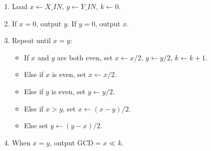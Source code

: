 \documentclass[11pt,a4paper]{article}
\begin{document}
\begin{enumerate}
  \item Load $x \leftarrow X\_IN$, $y \leftarrow Y\_IN$, $k \leftarrow 0$.
  \item If $x=0$, output $y$. If $y=0$, output $x$.
  \item Repeat until $x=y$:
  \begin{itemize}
    \item If $x$ and $y$ are both even, set $x \leftarrow x/2$, $y \leftarrow y/2$, $k \leftarrow k+1$.
    \item Else if $x$ is even, set $x \leftarrow x/2$.
    \item Else if $y$ is even, set $y \leftarrow y/2$.
    \item Else if $x>y$, set $x \leftarrow (x-y)/2$.
    \item Else set $y \leftarrow (y-x)/2$.
  \end{itemize}
  \item When $x=y$, output $\mathrm{GCD}=x \ll k$.
\end{enumerate}
\end{document}
